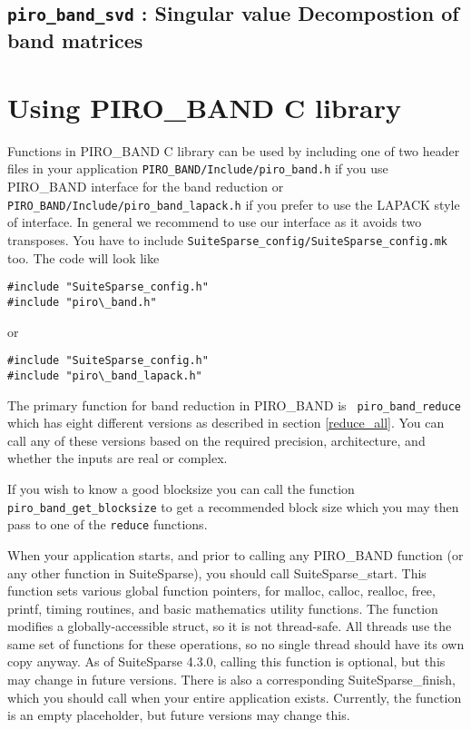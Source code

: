 \documentclass[11pt]{article}
\begin{document}
\subsection{{\tt piro\_band\_svd} : Singular value Decompostion of band matrices}


\newpage \section{Using PIRO\_BAND C library}

Functions in PIRO\_BAND C library can be used by including one of two header
files in your application {\tt PIRO\_BAND/Include/piro\_band.h} if you use
PIRO\_BAND interface for the band reduction or {\tt
PIRO\_BAND/Include/piro\_band\_lapack.h} if you prefer to use the LAPACK style
of interface. In general we recommend to use our interface as it avoids two
transposes. You have to include
{\tt SuiteSparse\_config/SuiteSparse\_config.mk}
too. The code will look like

\begin{verbatim}
#include "SuiteSparse_config.h"
#include "piro\_band.h"
\end{verbatim}

or 

\begin{verbatim}
#include "SuiteSparse_config.h"
#include "piro\_band_lapack.h"
\end{verbatim}

The primary function for band reduction in PIRO\_BAND is {\tt
piro\_band\_reduce} which has eight different versions as described in section
\ref{reduce_all}. You can call any of these versions based on the required
precision, architecture, and whether the inputs are real or complex.

If you wish to know a good  blocksize you can call the function {\tt
piro\_band\_get\_blocksize} to get a recommended block size which you may then
pass to one of the {\tt reduce} functions.

When your application starts, and prior to calling any PIRO\_BAND function (or
any other function in SuiteSparse), you should call SuiteSparse\_start.  This
function sets various global function pointers, for malloc, calloc, realloc,
free, printf, timing routines, and basic mathematics utility functions.  The
function modifies a globally-accessible struct, so it is not thread-safe.  All
threads use the same set of functions for these operations, so no single thread
should have its own copy anyway.  As of SuiteSparse 4.3.0, calling this
function is optional, but this may change in future versions.  There is also a
corresponding SuiteSparse\_finish, which you should call when your entire
application exists.  Currently, the function is an empty placeholder, but
future versions may change this.
\end{document}
